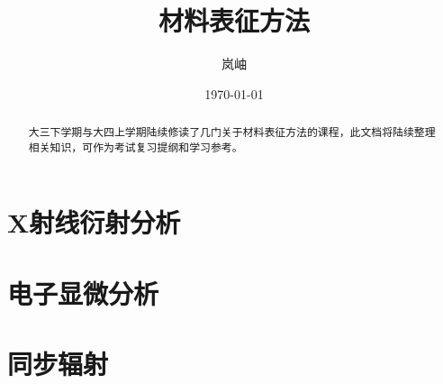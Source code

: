 \documentclass[12pt,a4paper]{article}
\title{\heiti 材料表征方法}
\author{\kaishu 岚岫}
\date{\today}
\begin{document}
    \maketitle
\begin{abstract}
    大三下学期与大四上学期陆续修读了几门关于材料表征方法的课程，此文档将陆续整理相关知识，可作为考试复习提纲和学习参考。
\end{abstract}
\section{X射线衍射分析}
\section{电子显微分析}
\section{同步辐射}
\end{document}
